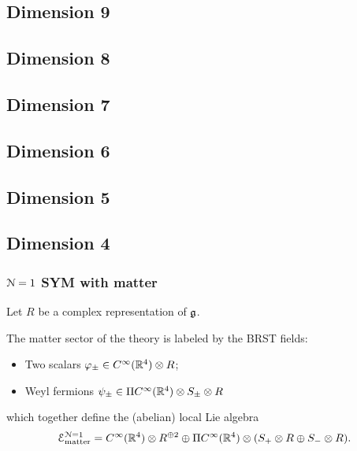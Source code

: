 \documentclass[10pt, oneside]{article}
\begin{document}
\subsection{Dimension 9}


\subsection{Dimension 8}


\subsection{Dimension 7}


\subsection{Dimension 6}



\subsection{Dimension 5}


\subsection{Dimension 4}


\subsubsection{$\mathcal N=1$ SYM with matter} 

Let $R$ be a complex representation of $\mathfrak{g}$.

The matter sector of the theory is labeled by the BRST fields:
\begin{itemize}
\item Two scalars $\varphi_{\pm} \in C^\infty (\mathbb R^4) \otimes R$;
\item Weyl fermions $\psi_{\pm} \in \Pi C^\infty(\mathbb R^4) \otimes S_{\pm} \otimes R$ 
\end{itemize} 
which together define the (abelian) local Lie algebra
\[
\mathcal E_{\rm matter}^{\mathcal N=1} = C^\infty (\mathbb R^4) \otimes R^{\oplus 2} \oplus  \Pi C^\infty(\mathbb R^4) \otimes (S_{+}  \otimes R \oplus S_- \otimes R) .
\]
\end{document}
